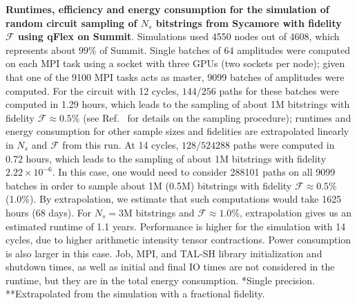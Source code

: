 \begin{table}
\caption{\label{table:qflex_runs} \textbf{Runtimes, efficiency and energy consumption for the simulation of random circuit sampling of $N_s$ bitstrings from Sycamore with fidelity $\mathcal{F}$ using qFlex on Summit}. Simulations used 4550 nodes out of 4608, which represents about $99\%$ of Summit. Single batches of $64$ amplitudes were computed on each MPI task using a socket with three GPUs (two sockets per node); given that one of the 9100 MPI tasks acts as master, 9099 batches of amplitudes were computed. For the circuit with 12 cycles, $144/256$ paths for these batches were computed in 1.29 hours, which leads to the sampling of about 1M bitstrings with fidelity $\mathcal{F}\approx 0.5\%$ (see Ref.~\cite{villalonga2019flexible} for details on the sampling procedure); runtimes and energy consumption for other sample sizes and fidelities are extrapolated linearly in $N_s$ and $\mathcal{F}$ from this run. At 14 cycles, $128/524288$ paths were computed in 0.72 hours, which leads to the sampling of about 1M bitstrings with fidelity $2.22\times 10^{-6}$. In this case, one would need to consider 288101 paths on all 9099 batches in order to sample about 1M (0.5M) bitstrings with fidelity $\mathcal{F}\approx 0.5\%$ (1.0\%). By extrapolation, we estimate that such computations would take 1625 hours (68 days). For $N_s=$3M bitstrings and $\mathcal{F}\approx1.0\%$, extrapolation gives us an estimated runtime of 1.1 years. Performance is higher for the simulation with 14 cycles, due to higher arithmetic intensity tensor contractions. Power consumption is also larger in this case. Job, MPI, and TAL-SH library initialization and shutdown times, as well as initial and final IO times are not considered in the runtime, but they are in the total energy consumption. *Single precision. **Extrapolated from the simulation with a fractional fidelity.}
\end{table}


